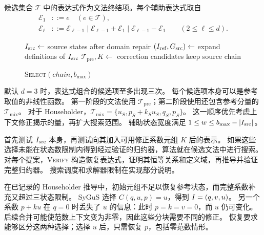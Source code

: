 候选集合 $\mathcal T$ 中的表达式作为文法终结项。每个辅助表达式取自
\[
\begin{aligned}
\mathcal E_1&::=e\quad(e\in\mathcal T),\\
\mathcal E_\ell&::=\mathcal E_{\ell-1}
 \mid\mathcal E_{\ell-1}+\mathcal E_1
 \mid\mathcal E_{\ell-1}-\mathcal E_1
 \qquad(2\le\ell\le d).
\end{aligned}
\]
\begingroup
\setlength{\intextsep}{4pt}
\begin{figure}
\begin{minipage}{\linewidth}
\begin{algorithm}[H]
\small
\SetInd{0.5em}{0.7em}
\caption{\textsc{Select}$(\mathit{chain},b_{\max})$}
\label{alg:select}
$I_{\mathrm{src}}\leftarrow$ source states after domain repair\;
$(I_{\mathrm{ref}},G_{\mathrm{src}})\leftarrow$ expand definitions of $I_{\mathrm{src}}$\;
$\mathcal T_{\mathrm{pre}},K\leftarrow$ correction candidates\;
\Return keep source chain\;
\end{algorithm}
\end{minipage}
\end{figure}
默认 $d=3$ 时，表达式组合的候选项至多出现三次。
每个候选项本身可以是参考取值的非线性函数。
第一阶段的文法使用 $\mathcal T_{\mathrm{pre}}$；第二阶段使用还包含参考分量的 $\mathcal T_{\mathrm{mix}}$。
对于 Householder，$\mathcal T_{\mathrm{mix}}=\{u_S,p_S+k_Su_S,q_S,p_S\}$。
这一顺序优先考虑上下文修正揭示的量，再扩大搜索范围。
辅助状态宽度满足 $1\le w\le b_{\max}-|I_{\mathrm{src}}|$。

 首先测试 $I_{\mathrm{src}}$ 本身，再测试向其加入可用修正系数元组 $K$ 后的表示。
如果这些选择未能在状态数限制内得到经过验证的归约器，算法就在候选文法中进行搜索。
对每个提案，\textsc{Verify} 构造恢复表达式，证明其恒等关系和定义域，再推导并验证完整归约器。
搜索调度和求解器限制在实现部分说明。

在已记录的 Householder 推导中，初始元组不足以恢复参考状态，而完整系数补充又超过三状态限制。
SyGuS 选择 $C(q,u,p)=u$，得到 $I=(q,v,u)$。
另一个系数 $p+ku$ 在 $q=0$ 时丢失了 $u$ 的信息：此时 $p=k=v=0$，而 $u$ 仍可变化。
后续合并可能使范数上下文变为非零，因此这些分块需要不同的修正。
恢复要求能够区分这两种选择；选择 $u$ 后，只需恢复 $p$，包括零范数情形。
\finishwrapspace
\endgroup

